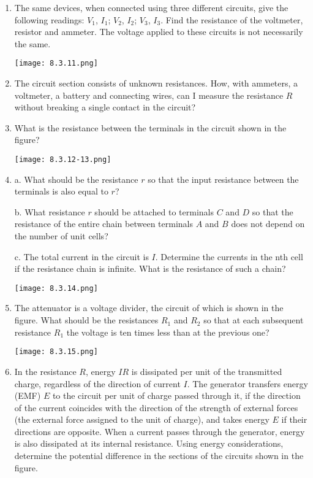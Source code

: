 \documentclass{article}
\begin{document}
\begin{enumerate}[label=8.3.\arabic*]
\item The same devices, when connected using three different circuits, give the following readings: $V_1$, $I_1$; $V_2$, $I_2$; $V_3$, $I_3$. Find the resistance of the voltmeter, resistor and ammeter. The voltage applied to these circuits is not necessarily the same. 

\begin{center}
    \texttt{[image: 8.3.11.png]}
\end{center}


\item The circuit section consists of unknown resistances. How, with ammeters, a voltmeter, a battery and connecting wires, can I measure the resistance $R$ without breaking a single contact in the circuit?

\item What is the resistance between the terminals in the circuit shown in the figure?

\begin{center}
    \texttt{[image: 8.3.12-13.png]}
\end{center}


\item a. What should be the resistance $r$ so that the input resistance between the terminals is also equal to $r$? 

b. What resistance $r$ should be attached to terminals $C$ and $D$ so that the resistance of the entire chain between terminals $A$ and $B$ does not depend on the number of unit cells? 

c. The total current in the circuit is $I$. Determine the currents in the nth cell if the resistance chain is infinite. What is the resistance of such a chain?

\begin{center}
    \texttt{[image: 8.3.14.png]}
\end{center}


\item The attenuator is a voltage divider, the circuit of which is shown in the figure. What should be the resistances $R_1$ and $R_2$ so that at each subsequent resistance $R_1$ the voltage is ten times less than at the previous one? 

\begin{center}
    \texttt{[image: 8.3.15.png]}
\end{center}


\item In the resistance $R$, energy $IR$ is dissipated per unit of the transmitted charge, regardless of the direction of current $I$. The generator transfers energy (EMF) $E$ to the circuit per unit of charge passed through it, if the direction of the current coincides with the direction of the strength of external forces (the external force assigned to the unit of charge), and takes energy $E$ if their directions are opposite. When a current passes through the generator, energy is also dissipated at its internal resistance. Using energy considerations, determine the potential difference in the sections of the circuits shown in the figure.


\end{enumerate}
\end{document}
